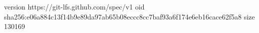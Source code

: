 version https://git-lfs.github.com/spec/v1
oid sha256:e06a884c13f14b9e89da97ab65b08eccc8cc7baf93a6f174e6eb16cace62f5a8
size 130169
